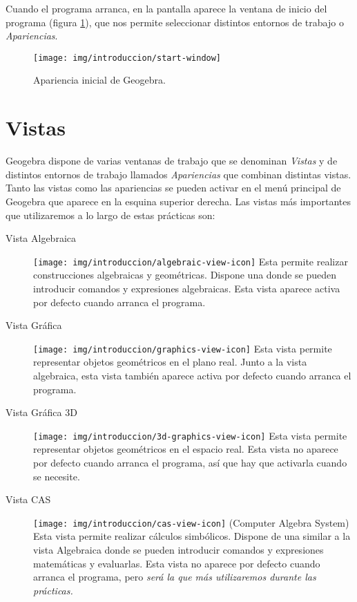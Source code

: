 Cuando el programa arranca, en la pantalla aparece la ventana de inicio del programa (figura \ref{g:ventana-inicio}), que nos permite seleccionar distintos entornos de trabajo o \emph{Apariencias}.

\begin{figure}[h!]
\begin{center}
\texttt{[image: img/introduccion/start-window]}
\caption{Apariencia inicial de Geogebra.} \label{g:ventana-inicio}
\end{center}
\end{figure}

\section{Vistas}
Geogebra dispone de varias ventanas de trabajo que se denominan \emph{Vistas} y de distintos entornos de trabajo llamados \emph{Apariencias} que combinan distintas vistas.
Tanto las vistas como las apariencias se pueden activar en el menú principal de Geogebra que aparece en la esquina superior derecha.
Las vistas más importantes que utilizaremos a lo largo de estas prácticas son:
\begin{description}
\item[Vista Algebraica] \texttt{[image: img/introduccion/algebraic-view-icon]} Esta permite realizar construcciones algebraicas y geométricas.
      Dispone una  donde se pueden introducir comandos y expresiones algebraicas.
      Esta vista aparece activa por defecto cuando arranca el programa.
\item[Vista Gráfica] \texttt{[image: img/introduccion/graphics-view-icon]} Esta vista permite representar objetos geométricos en el plano real.
      Junto a la vista algebraica, esta vista también aparece activa por defecto cuando arranca el programa.
\item[Vista Gráfica 3D] \texttt{[image: img/introduccion/3d-graphics-view-icon]} Esta vista permite representar objetos geométricos en el espacio real.
      Esta vista no aparece por defecto cuando arranca el programa, así que hay que activarla cuando se necesite.
\item[Vista CAS] \texttt{[image: img/introduccion/cas-view-icon]} (Computer Algebra System) Esta vista permite realizar cálculos simbólicos. Dispone de una  similar a la vista Algebraica donde se pueden introducir comandos y expresiones matemáticas y evaluarlas.
      Esta vista no aparece por defecto cuando arranca el programa, pero \emph{será la que más utilizaremos durante las prácticas.}
\end{description}


